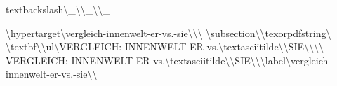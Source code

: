 textbackslash{}\textbackslash{}_\textbackslash{}\textbackslash{}_\textbackslash{}\textbackslash{}_

\textbackslash{}hypertarget\textbackslash{}{vergleich-innenwelt-er-vs.-sie\textbackslash{}}\textbackslash{}{\textbackslash{}%
\textbackslash{}subsection\textbackslash{}{\textbackslash{}texorpdfstring\textbackslash{}{🔄 \textbackslash{}textbf\textbackslash{}{\textbackslash{}ul\textbackslash{}{VERGLEICH: INNENWELT ER vs.\textbackslash{}textasciitilde\textbackslash{}{\textbackslash{}}SIE\textbackslash{}}\textbackslash{}}\textbackslash{}}\textbackslash{}{🔄 VERGLEICH: INNENWELT ER vs.\textbackslash{}textasciitilde\textbackslash{}{\textbackslash{}}SIE\textbackslash{}}\textbackslash{}}\textbackslash{}label\textbackslash{}{vergleich-innenwelt-er-vs.-sie\textbackslash{}}\textbackslash{}}

